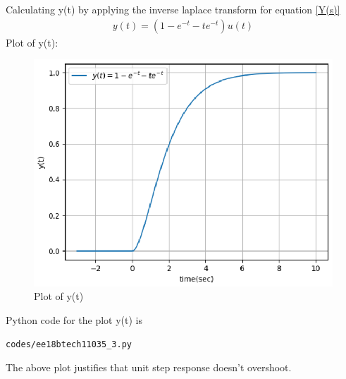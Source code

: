 \begin{enumerate}[label=\thesection.\arabic*.,ref=\thesection.\theenumi]
Calculating y(t) by applying the inverse laplace transform for equation \eqref{Y(s)}
\begin{align}
y(t) = (1-e^{-t}-te^{-t})u(t)
\end{align}
Plot of y(t):
\begin{figure}[!h]
\includegraphics[width=\columnwidth]{./figures/ee18btech11035_3.eps}
\caption{Plot of y(t)}
\label{fig:ee18btech11035_y(t)}
\end{figure}

Python code for the plot y(t) is
\begin{lstlisting}
codes/ee18btech11035_3.py
\end{lstlisting}

The above plot justifies that unit step response doesn't overshoot.

\end{enumerate}
